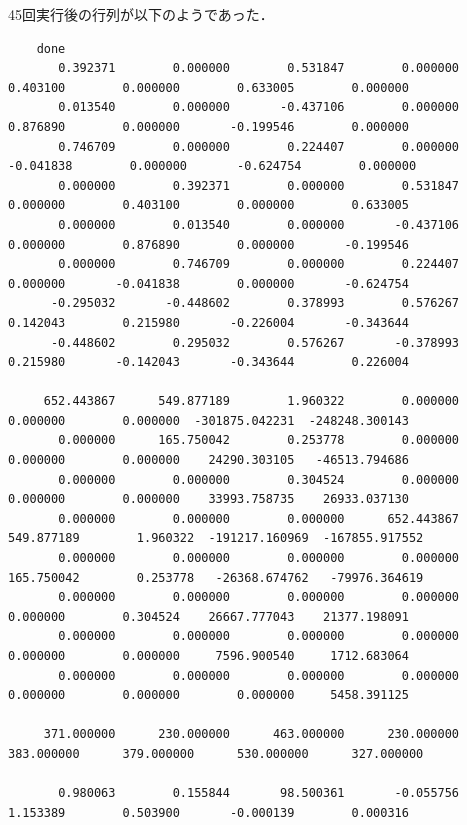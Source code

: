 \documentclass[11pt]{jarticle}
\begin{document}
\normalsize
45回実行後の行列が以下のようであった．
\tiny
\begin{verbatim}
    done
       0.392371        0.000000        0.531847        0.000000        0.403100        0.000000        0.633005        0.000000 
       0.013540        0.000000       -0.437106        0.000000        0.876890        0.000000       -0.199546        0.000000 
       0.746709        0.000000        0.224407        0.000000       -0.041838        0.000000       -0.624754        0.000000 
       0.000000        0.392371        0.000000        0.531847        0.000000        0.403100        0.000000        0.633005 
       0.000000        0.013540        0.000000       -0.437106        0.000000        0.876890        0.000000       -0.199546 
       0.000000        0.746709        0.000000        0.224407        0.000000       -0.041838        0.000000       -0.624754 
      -0.295032       -0.448602        0.378993        0.576267        0.142043        0.215980       -0.226004       -0.343644 
      -0.448602        0.295032        0.576267       -0.378993        0.215980       -0.142043       -0.343644        0.226004 

     652.443867      549.877189        1.960322        0.000000        0.000000        0.000000  -301875.042231  -248248.300143 
       0.000000      165.750042        0.253778        0.000000        0.000000        0.000000    24290.303105   -46513.794686 
       0.000000        0.000000        0.304524        0.000000        0.000000        0.000000    33993.758735    26933.037130 
       0.000000        0.000000        0.000000      652.443867      549.877189        1.960322  -191217.160969  -167855.917552 
       0.000000        0.000000        0.000000        0.000000      165.750042        0.253778   -26368.674762   -79976.364619 
       0.000000        0.000000        0.000000        0.000000        0.000000        0.304524    26667.777043    21377.198091 
       0.000000        0.000000        0.000000        0.000000        0.000000        0.000000     7596.900540     1712.683064 
       0.000000        0.000000        0.000000        0.000000        0.000000        0.000000        0.000000     5458.391125 

     371.000000      230.000000      463.000000      230.000000      383.000000      379.000000      530.000000      327.000000 

       0.980063        0.155844       98.500361       -0.055756        1.153389        0.503900       -0.000139        0.000316 
\end{verbatim}
\normalsize
\end{document}

